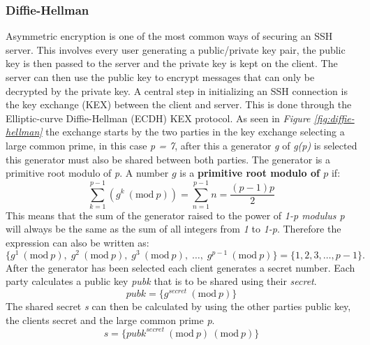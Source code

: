 \documentclass[12pt]{article}
\newcommand{\Mod}[1]{\ (\mathrm{mod}\ #1)}
\begin{document}
\subsubsection{Diffie-Hellman}
Asymmetric encryption is one of the most common ways of securing an SSH server.
This involves every user generating a public/private key pair, the
public key is then passed to the server and the private key is kept on the client.
The server can then use the public key to encrypt messages that can only be decrypted
by the private key. A central step in initializing an SSH connection is the 
key exchange (KEX) between the client and server. This is done through 
the Elliptic-curve Diffie-Hellman (ECDH) KEX protocol.
As seen in \textit{Figure \ref{fig:diffie-hellman}} the exchange starts by 
the two parties in the key exchange selecting a large common prime, in this case
\textit{p = 7}, after this a generator \textit{g} of \textit{g(p)} is selected
this generator must also be shared between both parties. The generator 
is a primitive root modulo of \textit{p}.
A number \( g \) is a \textbf{primitive root modulo of \( p \)} if:
\[
\sum_{k=1}^{p-1} \left( g^k\Mod{p} \right) = \sum_{n=1}^{p-1} n = \frac{(p-1)p}{2}
\]
This means that the sum of the generator raised to the power of \textit{1-p modulus p} will always be the 
same as the sum of all integers from \textit{1} to \textit{1-p}. Therefore the expression can also be written as:
\[
\{ g^1\Mod{p},\;g^2\Mod{p},\;g^3\Mod{p},\;\dots,\;g^{p-1} \Mod{p} \} = \{ 1, 2, 3, \dots, p-1 \}.
\]
After the generator has been selected each client generates a secret number.
Each party calculates a public key \textit{pubk} that is to be shared using their \textit{secret}.
\[
pubk = \{g^{secret} \Mod{p}\}
\]
The shared secret \textit{s} can then be calculated by using the other parties public key,
the clients secret and the large common prime \textit{p}.
\[
s = \{pubk^{secret} \Mod{p} \Mod{p}\}
\]
\end{document}
